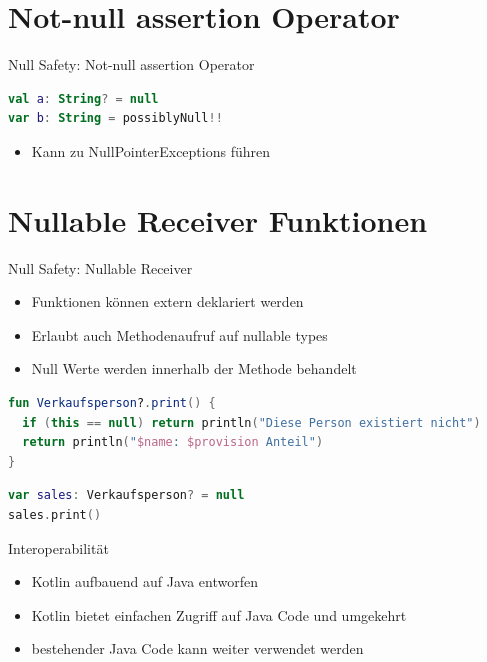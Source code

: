 \documentclass{beamer}
\begin{document}
\section{Not-null assertion Operator}

\begin{frame}[fragile]{Null Safety: Not-null assertion Operator}
  \begin{lstlisting}[language=Kotlin]
val a: String? = null
var b: String = possiblyNull!!
  \end{lstlisting}
  \pause
  \begin{itemize}[<+->]
    \item Kann zu NullPointerExceptions führen
  \end{itemize}
\end{frame}

\section{Nullable Receiver Funktionen}

\begin{frame}[fragile]{Null Safety: Nullable Receiver}
  \begin{itemize}[<+->]
    \item Funktionen können extern deklariert werden
    \item Erlaubt auch Methodenaufruf auf nullable types
    \item Null Werte werden innerhalb der Methode behandelt
  \end{itemize}
  \pause \vspace{1cm}
  \begin{lstlisting}[language=Kotlin]
fun Verkaufsperson?.print() {
  if (this == null) return println("Diese Person existiert nicht")
  return println("$name: $provision Anteil")
}
  \end{lstlisting}
  \pause
  \begin{lstlisting}[language=Kotlin]
var sales: Verkaufsperson? = null
sales.print()
  \end{lstlisting}
\end{frame}

\begin{frame}[fragile]{Interoperabilität}
  \begin{itemize}[<+->]
    \item Kotlin aufbauend auf Java entworfen
    \item Kotlin bietet einfachen Zugriff auf Java Code und umgekehrt
    \item bestehender Java Code kann weiter verwendet werden
  \end{itemize}
\end{frame}
\end{document}
